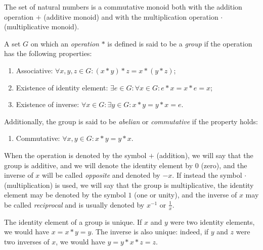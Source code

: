 \begin{example}
The set of natural numbers is a commutative monoid both with the addition
operation $+$ (additive monoid) and with the multiplication operation $\cdot$
(multiplicative monoid).
\end{example}
  
\begin{definition}[Group]
  \label{def:gruppo}%
    A set $G$ on which an \emph{operation} $*$ is defined is said to be a
  \emph{group}%
%
 if the operation has the following properties:
  \begin{enumerate}
    \item Associative: $\forall x,y,z\in G\colon (x*y)*z = x*(y*z)$;
    \item Existence of identity element: 
    $\exists e\in G\colon \forall x\in G \colon e*x=x*e = x$;
    \item Existence of inverse: 
    $\forall x\in G\colon \exists y\in G\colon x*y=y*x=e$.
  \end{enumerate}
  Additionally, the group is said to be \emph{abelian}%
%
 or \emph{commutative} if the property holds:
  \begin{enumerate}
    \item[4.] Commutative: $\forall x,y\in G\colon x*y = y*x$.
  \end{enumerate}
  
    When the operation is denoted by the symbol $+$ (addition), we will say that
  the group is additive, and we will denote the identity element by $0$
    (zero), and the inverse of $x$ will be called \emph{opposite} and denoted by
  $-x$.
    If instead the symbol $\cdot$ (multiplication) is used, we will say that the
  group is multiplicative, the identity element may be denoted by the symbol $1$
  (one or unity), and
    the inverse of $x$ may be called \emph{reciprocal} and is usually denoted by
  $x^{-1}$ or $\frac 1 x$.
\end{definition}
  
The identity element of a group is unique. If $x$ and $y$ were two identity
elements, we would have $x = x*y = y$. The inverse is also unique: indeed, if
$y$ and $z$ were two inverses of $x$, we would have $y = y * x * z = z$.

